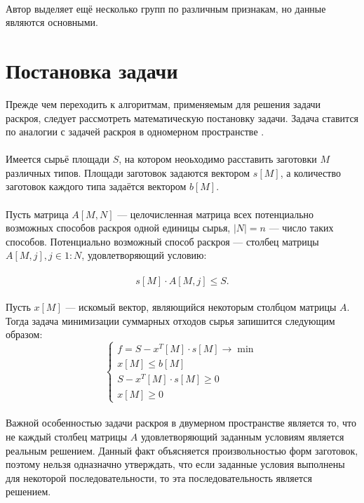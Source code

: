 \documentclass[14pt]{extarticle}
\begin{document}
	\paragraph{}
	Автор выделяет ещё несколько групп по различным признакам, но данные являются
	основными.
	\newpage
	\section{Постановка задачи}
	Прежде чем переходить к алгоритмам, применяемым для решения задачи раскроя, следует рассмотреть математическую постановку задачи. Задача ставится по аналогии с задачей раскроя в одномерном пространстве \cite{Nikitenkov}.
	\paragraph{}
	Имеется сырьё площади $S$, на котором неоьходимо расставить заготовки $M$ различных типов. Площади заготовок задаются вектором $s[M]$, а количество заготовок каждого типа задаётся вектором $b[M]$.
	\paragraph{}
	Пусть матрица $A[M, N]$ --- целочисленная матрица всех потенциально возможных способов раскроя одной единицы сырья, $|N|=n$ --- число таких способов. Потенциально возможный способ раскроя --- столбец матрицы $A[M, j], j\in 1:N$, удовлетворяющий условию:
	\paragraph{}
	\begin{equation}
		s[M]\cdot A[M,j]\leq S.
	\end{equation}
	\paragraph{}
	Пусть $x[M]$ --- искомый вектор, являющийся некоторым столбцом матрицы $A$. Тогда задача минимизации суммарных отходов сырья запишится следующим образом:
	\begin{equation}
		\begin{cases}
			f = S - x^T[M]\cdot s[M] \to \min \\
			x[M] \leq b[M]\\
			S - x^T[M]\cdot s[M] \geq 0 \\
			x[M] \geq 0
		\end{cases}
	\end{equation}
	\paragraph{}
	Важной особенностью задачи раскроя в двумерном пространстве является то, что не каждый столбец матрицы $A$ удовлетворяющий заданным условиям является реальным решением. Данный факт объясняется произвольностью форм заготовок, поэтому нельзя одназначно утверждать, что если заданные условия выполнены для некоторой последовательности, то эта последовательность является решением.
\end{document}
